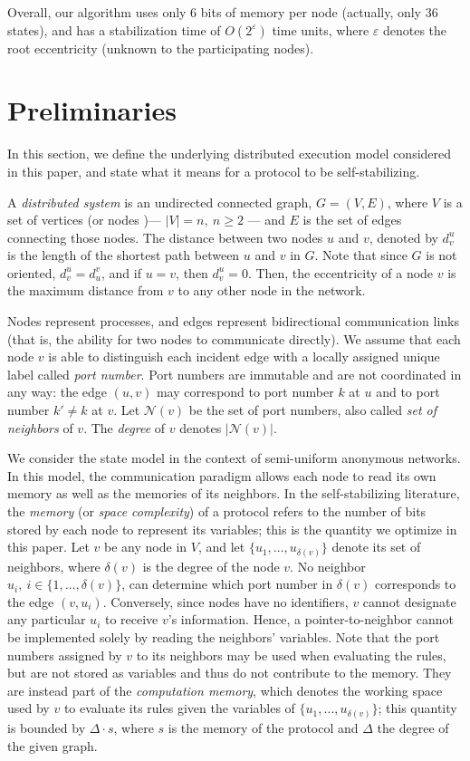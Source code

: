 \documentclass[a4paper, 12pt]{article}
\newcommand{\Neig}{\mathcal{N}}
\begin{document}
Overall, our algorithm uses only 6 bits of memory per node (actually, only 36 states), and has a stabilization time of $O(2^{\varepsilon})$ time units, where $\varepsilon$ denotes the root eccentricity (unknown to the participating nodes).

\section{Preliminaries}
\label{sec:model}

In this section, we define the underlying distributed execution model considered in this paper, and state what it means for a protocol to be self-stabilizing.  

A \textit{distributed system} is an undirected connected graph, $G=(V,E)$, where $V$ is a set of vertices (or nodes )--- $|V|=n,\ n \geq 2$ --- and $E$ is the set of edges connecting those nodes. 
The distance between two nodes $u$ and $v$, denoted by $d^u_v$ is the length of the shortest path between $u$ and $v$ in $G$. 
Note that since $G$ is not oriented, $d^u_v=d^v_u$, and if $u=v$, then $d^u_v=0$. Then, the eccentricity of a node $v$ is the maximum distance from $v$ to any other node in the network. 

Nodes represent processes, and edges represent bidirectional communication links (that is, the ability for two nodes to communicate directly).  
We assume that each node $v$ is able to distinguish each incident edge with a locally assigned unique label called \textit{port number}. 
Port numbers are immutable and are not coordinated in any way: the edge $(u,v)$ may correspond to port number $k$ at $u$ and to port number $k'\neq k$ at $v$.
Let $\Neig(v)$ be the set of port numbers, also called \textit{set of neighbors} of $v$. 
The \textit{degree} of $v$ denotes $|\Neig(v)|$. 

We consider the state model \cite{D74} in the context of semi-uniform anonymous 
networks. In this model, the communication paradigm allows each node 
to read its own memory as well as the memories of its neighbors.
In the self-stabilizing literature, the \emph{memory} (or 
\emph{space complexity}) of a protocol refers to the number of bits 
stored by each node to represent its variables; this is the quantity 
we optimize in this paper.
Let $v$ be any node in $V$, and let $\{u_1, \ldots, u_{\delta(v)}\}$ 
denote its set of neighbors, where $\delta(v)$ is the degree of the node $v$. No neighbor $u_i,\ i \in \{1, \ldots, 
\delta(v)\}$, can determine which port number in $\delta(v)$ 
corresponds to the edge $(v,u_i)$. Conversely, since nodes have no 
identifiers, $v$ cannot designate any particular $u_i$ to receive 
$v$'s information. Hence, a pointer-to-neighbor cannot be implemented 
solely by reading the neighbors' variables. Note that the port numbers 
assigned by $v$ to its neighbors may be used when evaluating the rules, 
but are not stored as variables and thus do not contribute to the 
memory. They are instead part of the \emph{computation memory}, which 
denotes the working space used by $v$ to evaluate its rules given the 
variables of $\{u_1, \ldots, u_{\delta(v)}\}$; this quantity is 
bounded by $\Delta \cdot s$, where $s$ is the memory of the 
protocol and $\Delta$ the degree of the given graph.
\end{document}
